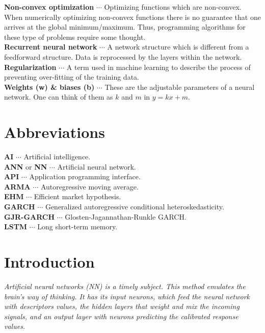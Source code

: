 \documentclass[12pt, letterpaper]{amsart}%
\begin{document}
\noindent
\textbf{Non-convex optimization} $\cdots$ Optimizing functions which are non-convex. When numerically optimizing non-convex functions there is no guarantee that one arrives at the global minimum/maximum. Thus, programming algorithms for these type of problems require some thought.
\\

\noindent
\textbf{Recurrent neural network} $\cdots$ A network structure which is different from a feedforward structure. Data is reprocessed by the layers within the network.
\\

\noindent
\textbf{Regularization} $\cdots$ A term used in machine learning to describe the process of preventing over-fitting of the training data.
\\

\noindent
\textbf{Weights (w) \& biases (b)} $\cdots$ These are the adjustable parameters of a neural network. One can think of them as $k$ and $m$ in $y = kx+m$.

\newpage

\section*{Abbreviations}
\noindent
\textbf{AI} $\cdots$ Artificial intelligence.
\\

\noindent
\textbf{ANN} or \textbf{NN} $\cdots$ Artificial neural network.
\\

\noindent
\textbf{API} $\cdots$ Application programming interface.
\\

\noindent
\textbf{ARMA} $\cdots$ Autoregressive moving average.
\\

\noindent
\textbf{EHM} $\cdots$ Efficient market hypothesis.
\\

\noindent
\textbf{GARCH} $\cdots$ Generalized autoregressive conditional heteroskedasticity.
\\

\noindent
\textbf{GJR-GARCH} $\cdots$ Glosten-Jagannathan-Runkle GARCH.
\\

\noindent
\textbf{LSTM} $\cdots$ Long short-term memory.

\newpage

\section{Introduction}
\begin{displayquote}
\textit{Artificial neural networks (NN) is a timely subject. This method emulates the brain's way of thinking. It has its input neurons, which feed the neural network with descriptors values, the hidden layers that weight and mix the incoming signals, and an output layer with neurons predicting the calibrated response values.}
\end{displayquote}
\end{document}
